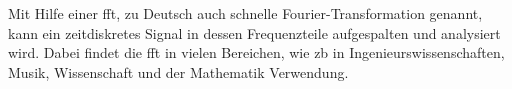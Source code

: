 \documentclass[../EDF Master Thesis.tex]{subfiles}
\begin{document}
Mit Hilfe einer \ac{fft}, zu Deutsch auch schnelle Fourier-Transformation genannt, kann ein zeitdiskretes Signal in dessen Frequenzteile aufgespalten und analysiert wird.
Dabei findet die \ac{fft} in vielen Bereichen, wie \ac{zb} in Ingenieurswissenschaften, Musik, Wissenschaft und der Mathematik Verwendung.
\end{document}
